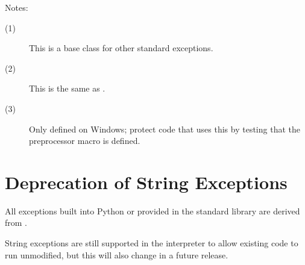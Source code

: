 \noindent
Notes:
\begin{description}
\item[(1)]
  This is a base class for other standard exceptions.

\item[(2)]
  This is the same as .

\item[(3)]
  Only defined on Windows; protect code that uses this by testing that
  the preprocessor macro  is defined.
\end{description}


\section{Deprecation of String Exceptions}

All exceptions built into Python or provided in the standard library
are derived from .

String exceptions are still supported in the interpreter to allow
existing code to run unmodified, but this will also change in a future 
release.
